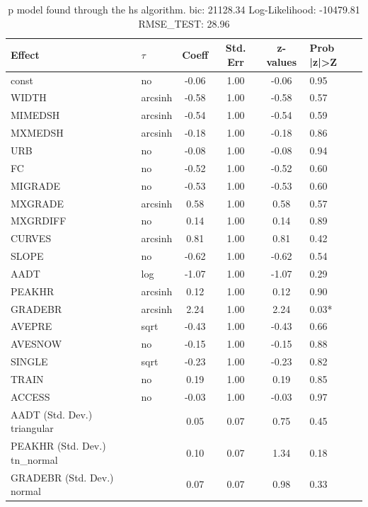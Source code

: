 \begin{table}
	\caption{p model found through the hs algorithm. bic: 21128.34 Log-Likelihood: -10479.81 RMSE_TEST: 28.96}
	\begin{center}
		\begin{tabular}{|l|l|c|c|c|l|}
			\hline
			Effect & $\tau$ & Coeff & Std. Err & z-values & Prob |z|>Z \\
			\hline
			const & no & -0.06 & 1.00 & -0.06 & 0.95 \\
			\hline
			WIDTH & arcsinh & -0.58 & 1.00 & -0.58 & 0.57 \\
			\hline
			MIMEDSH & arcsinh & -0.54 & 1.00 & -0.54 & 0.59 \\
			\hline
			MXMEDSH & arcsinh & -0.18 & 1.00 & -0.18 & 0.86 \\
			\hline
			URB & no & -0.08 & 1.00 & -0.08 & 0.94 \\
			\hline
			FC & no & -0.52 & 1.00 & -0.52 & 0.60 \\
			\hline
			MIGRADE & no & -0.53 & 1.00 & -0.53 & 0.60 \\
			\hline
			MXGRADE & arcsinh & 0.58 & 1.00 & 0.58 & 0.57 \\
			\hline
			MXGRDIFF & no & 0.14 & 1.00 & 0.14 & 0.89 \\
			\hline
			CURVES & arcsinh & 0.81 & 1.00 & 0.81 & 0.42 \\
			\hline
			SLOPE & no & -0.62 & 1.00 & -0.62 & 0.54 \\
			\hline
			AADT & log & -1.07 & 1.00 & -1.07 & 0.29 \\
			\hline
			PEAKHR & arcsinh & 0.12 & 1.00 & 0.12 & 0.90 \\
			\hline
			GRADEBR & arcsinh & 2.24 & 1.00 & 2.24 & 0.03* \\
			\hline
			AVEPRE & sqrt & -0.43 & 1.00 & -0.43 & 0.66 \\
			\hline
			AVESNOW & no & -0.15 & 1.00 & -0.15 & 0.88 \\
			\hline
			SINGLE & sqrt & -0.23 & 1.00 & -0.23 & 0.82 \\
			\hline
			TRAIN & no & 0.19 & 1.00 & 0.19 & 0.85 \\
			\hline
			ACCESS & no & -0.03 & 1.00 & -0.03 & 0.97 \\
			\hline
			AADT (Std. Dev.) triangular &  & 0.05 & 0.07 & 0.75 & 0.45 \\
			\hline
			PEAKHR (Std. Dev.) tn_normal &  & 0.10 & 0.07 & 1.34 & 0.18 \\
			\hline
			GRADEBR (Std. Dev.) normal &  & 0.07 & 0.07 & 0.98 & 0.33 \\

\end{tabular}
\end{center}
\end{table}
